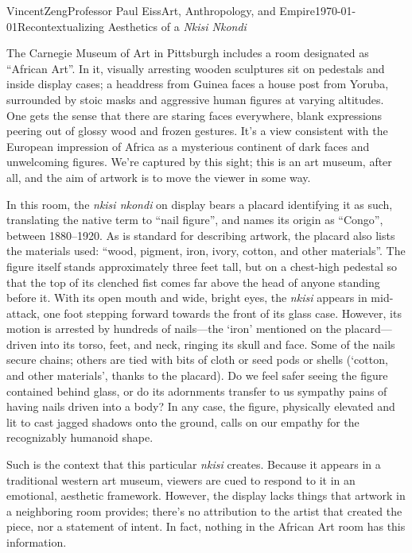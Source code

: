 \documentclass[12pt]{article}
\begin{document}
\begin{mla}{Vincent}{Zeng}{Professor Paul Eiss}{Art, Anthropology, and
    Empire}{\today}{Recontextualizing Aesthetics of a \textit{Nkisi Nkondi}}

The Carnegie Museum of Art in Pittsburgh includes a room designated as ``African
Art''. In it, visually arresting wooden sculptures sit on pedestals and
inside display cases; a headdress from Guinea faces a house post from Yoruba,
surrounded by stoic masks and aggressive human figures at varying altitudes. One gets
the sense that there are staring faces everywhere, blank expressions peering out
of glossy wood and frozen gestures. It's a view consistent with the European
impression of Africa as a mysterious continent of dark faces and unwelcoming
figures. We're captured by this sight; this is an art museum, after all, and the
aim of artwork is to move the viewer in some way.

In this room, the \textit{nkisi nkondi} on display bears a placard identifying it as such,
translating the native term to ``nail figure'', and names its origin as
``Congo'', between 1880--1920. As is standard for describing artwork, the placard also lists the
materials used: ``wood, pigment, iron, ivory, cotton, and other materials''. The
figure itself stands approximately three feet tall, but on a chest-high pedestal
so that the top of its clenched fist comes far above the head of anyone standing
before it. With its open mouth and wide, bright eyes, the \textit{nkisi} appears
in mid-attack, one foot stepping forward towards the front of its glass case.
However, its motion is arrested by hundreds of nails---the `iron' mentioned on the
placard---driven into its torso, feet, and neck, ringing its skull and face. Some of the
nails secure chains; others are tied with bits of cloth or seed pods or shells
(`cotton, and other materials', thanks to the placard). Do we feel safer seeing
the figure contained behind glass, or do its adornments transfer to us sympathy
pains of having nails driven into a body? In any case, the figure, physically
elevated and lit to cast jagged shadows onto the ground, calls on our empathy
for the recognizably humanoid shape.

Such is the context that this particular \textit{nkisi} creates. Because it
appears in a traditional western art museum, viewers are cued to respond to it
in an emotional, aesthetic framework. However, the display lacks things that artwork
in a neighboring room provides; there's no attribution to the artist that created
the piece, nor a statement of intent. In fact, nothing in the African Art room
has this information.


\end{mla}
\end{document}

